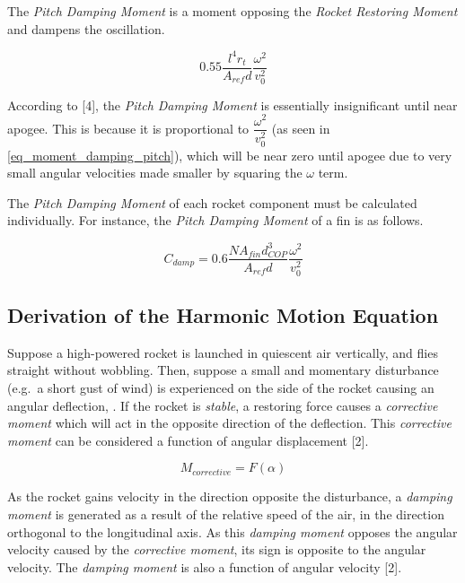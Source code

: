 \documentclass[]{article}
\begin{document}
The \emph{Pitch Damping Moment} is a moment opposing the \emph{Rocket
Restoring Moment} and dampens the oscillation.

\begin{equation}
\label{eq_moment_damping_pitch}
0.55 \dfrac{l^4 r_t}{A_{ref} d} \dfrac{\omega^2}{v^2_0}
\end{equation}

According to {[}4{]}, the \emph{Pitch Damping Moment} is essentially
insignificant until near apogee. This is because it is proportional to
\(\dfrac{\omega^2}{v^2_0}\) (as seen in \ref{eq_moment_damping_pitch}),
which will be near zero until apogee due to very small angular
velocities made smaller by squaring the \(\omega\) term.

The \emph{Pitch Damping Moment} of each rocket component must be
calculated individually. For instance, the \emph{Pitch Damping Moment}
of a fin is as follows.

\begin{equation}
\label{eq_moment_damping_pitch_fin}
C_{damp} = 0.6 \dfrac{N A_{fin} d_{COP}^3}{A_{ref} d} \dfrac{\omega^2}{v^2_0}
\end{equation}

\subsection{Derivation of the Harmonic Motion
Equation}\label{derivation-of-the-harmonic-motion-equation}

Suppose a high-powered rocket is launched in quiescent air vertically,
and flies straight without wobbling. Then, suppose a small and momentary
disturbance (e.g.~a short gust of wind) is experienced on the side of
the rocket causing an angular deflection, . If the rocket is
\emph{stable}, a restoring force causes a \emph{corrective moment} which
will act in the opposite direction of the deflection. This
\emph{corrective moment} can be considered a function of angular
displacement {[}2{]}.

\begin{equation}
M_{corrective} = F (\alpha)
\end{equation}

As the rocket gains velocity in the direction opposite the disturbance,
a \emph{damping moment} is generated as a result of the relative speed
of the air, in the direction orthogonal to the longitudinal axis. As
this \emph{damping moment} opposes the angular velocity caused by the
\emph{corrective moment}, its sign is opposite to the angular velocity.
The \emph{damping moment} is also a function of angular velocity
{[}2{]}.
\end{document}
